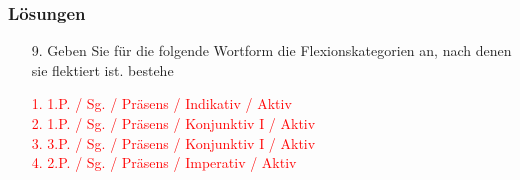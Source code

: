 
\begin{frame}
\frametitle{Lösungen}

\begin{itemize}

\item [9.] Geben Sie für die folgende Wortform die Flexionskategorien an, nach denen sie flektiert ist.%
\ea
bestehe
\z

\item [] \textcolor{red}{
	1. \ras 1.P. / Sg. / Präsens / Indikativ / Aktiv\\
	2. \ras 1.P. / Sg. / Präsens / Konjunktiv I / Aktiv\\
	3. \ras 3.P. / Sg. / Präsens / Konjunktiv I / Aktiv\\
	4. \ras 2.P. / Sg. / Präsens / Imperativ / Aktiv\\
}
\end{itemize}

\end{frame}

